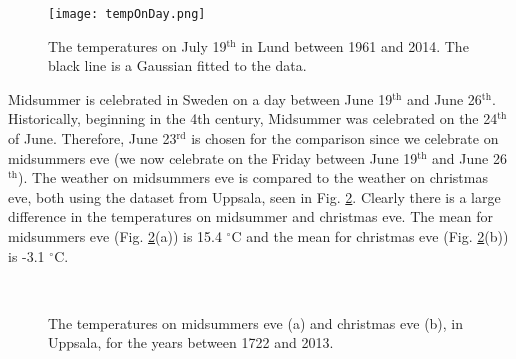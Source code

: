 \begin{figure}[ht]
\begin{center}
\texttt{[image: tempOnDay.png]}
\caption{\label{fig:tempOnDay} The temperatures on July 19$^{\text{th}}$ in Lund between 1961 and 2014. The black line is a Gaussian fitted to the data.}
\end{center}
\end{figure}


Midsummer is celebrated in Sweden on a day between June 19$^{\text{th}}$ and June 26$^{\text{th}}$. Historically, beginning in the 4th century, Midsummer was celebrated on the 24$^{\text{th}}$ of June. Therefore, June 23$^{\text{rd}}$ is chosen for the comparison since we celebrate on midsummers eve (we now celebrate on the Friday between June 19$^{\text{th}}$ and June 26$^{\text{th}}$). The weather on midsummers eve is compared to the weather on christmas eve, both using the dataset from Uppsala, seen in Fig. \ref{fig:midsummerchristmas}. Clearly there is a large difference in the temperatures on midsummer and christmas eve. The mean for midsummers eve (Fig. \ref{fig:midsummerchristmas}(a)) is 15.4 $^{\circ}$C and the mean for christmas eve (Fig. \ref{fig:midsummerchristmas}(b)) is -3.1 $^{\circ}$C.

\begin{figure}[ht]
\centering
{} 
\\
\caption{The temperatures on midsummers eve (a) and christmas eve (b), in Uppsala, for the years between 1722 and 2013.}
\label{fig:midsummerchristmas}
\end{figure}



